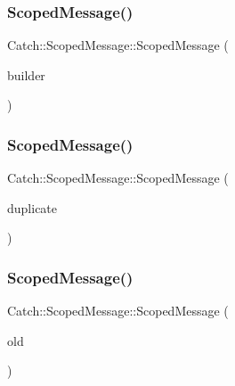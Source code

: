 \subsubsection{\texorpdfstring{Scoped\+Message()}{ScopedMessage()}\hspace{0.1cm}{\footnotesize\ttfamily [1/3]}}
{\footnotesize\ttfamily Catch\+::\+Scoped\+Message\+::\+Scoped\+Message (\begin{DoxyParamCaption}\item[{\mbox{\hyperlink{struct_catch_1_1_message_builder}{Message\+Builder}} const \&}]{builder }\end{DoxyParamCaption})\hspace{0.3cm}{\ttfamily [explicit]}}

\mbox{\label{class_catch_1_1_scoped_message_a5fe2e79afdfd737818c15edfc49f378e}} 
\subsubsection{\texorpdfstring{Scoped\+Message()}{ScopedMessage()}\hspace{0.1cm}{\footnotesize\ttfamily [2/3]}}
{\footnotesize\ttfamily Catch\+::\+Scoped\+Message\+::\+Scoped\+Message (\begin{DoxyParamCaption}\item[{\mbox{\hyperlink{class_catch_1_1_scoped_message}{Scoped\+Message}} \&}]{duplicate }\end{DoxyParamCaption})\hspace{0.3cm}{\ttfamily [delete]}}

\mbox{\label{class_catch_1_1_scoped_message_aac833a6a2245a26e6bd5c9252ca1caa0}} 
\subsubsection{\texorpdfstring{Scoped\+Message()}{ScopedMessage()}\hspace{0.1cm}{\footnotesize\ttfamily [3/3]}}
{\footnotesize\ttfamily Catch\+::\+Scoped\+Message\+::\+Scoped\+Message (\begin{DoxyParamCaption}\item[{\mbox{\hyperlink{class_catch_1_1_scoped_message}{Scoped\+Message}} \&\&}]{old }\end{DoxyParamCaption})}

